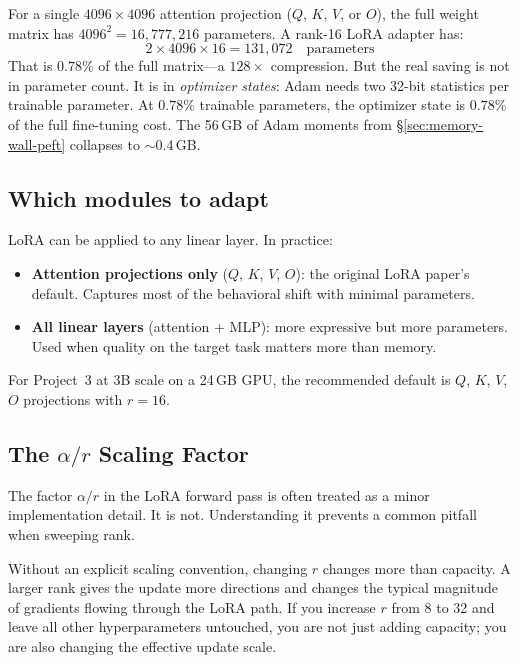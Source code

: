 For a single $4096 \times 4096$ attention projection ($Q$, $K$, $V$, or $O$), the full weight matrix has $4096^2 = 16{,}777{,}216$ parameters. A rank-16 LoRA adapter has:
\[
2 \times 4096 \times 16 = 131{,}072 \quad \text{parameters}
\]
That is $0.78\%$ of the full matrix---a $128\times$ compression. But the real saving is not in parameter count. It is in \emph{optimizer states}: Adam needs two 32-bit statistics per trainable parameter. At $0.78\%$ trainable parameters, the optimizer state is $0.78\%$ of the full fine-tuning cost. The 56\,GB of Adam moments from \S\ref{sec:memory-wall-peft} collapses to $\sim$0.4\,GB.

\subsection{Which modules to adapt}

LoRA can be applied to any linear layer. In practice:

\begin{itemize}[nosep]
  \item \textbf{Attention projections only} ($Q$, $K$, $V$, $O$): the original LoRA paper's default. Captures most of the behavioral shift with minimal parameters.
  \item \textbf{All linear layers} (attention + MLP): more expressive but more parameters. Used when quality on the target task matters more than memory.
\end{itemize}

For Project~3 at 3B scale on a 24\,GB GPU, the recommended default is $Q$, $K$, $V$, $O$ projections with $r = 16$.

\subsection{\texorpdfstring{The $\alpha/r$ Scaling Factor}{The alpha/r Scaling Factor}}

The factor $\alpha/r$ in the LoRA forward pass is often treated as a minor implementation detail. It is not. Understanding it prevents a common pitfall when sweeping rank.

Without an explicit scaling convention, changing $r$ changes more than capacity. A larger rank gives the update more directions and changes the typical magnitude of gradients flowing through the LoRA path. If you increase $r$ from 8 to 32 and leave all other hyperparameters untouched, you are not just adding capacity; you are also changing the effective update scale.

